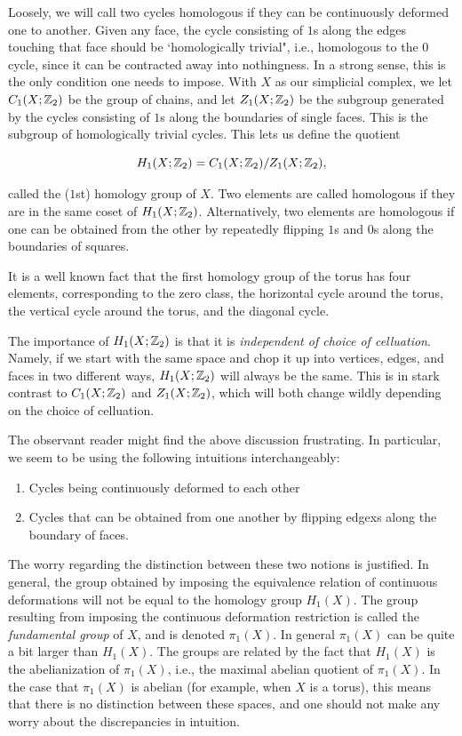 \documentclass{article}
\theoremstyle{definition}
\numberwithin{figure}{section}
\begin{document}
Loosely, we will call two cycles homologous if they can be continuously deformed one to another. Given any face, the cycle consisting of $1$s along the edges touching that face should be `homologically trivial", i.e., homologous to the $0$ cycle, since it can be contracted away into nothingness. In a strong sense, this is the only condition one needs to impose. With $X$ as our simplicial complex, we let $C_1(X;\mathbb{Z}_2)$ be the group of chains, and let $Z_1(X;\mathbb{Z}_2)$ be the subgroup generated by the cycles consisting of $1$s along the boundaries of single faces. This is the subgroup of homologically trivial cycles. This lets us define the quotient

$$H_1(X;\mathbb{Z}_2)=C_1(X;\mathbb{Z}_2)/Z_1(X;\mathbb{Z}_2),$$

called the ($1$st) homology group of $X$. Two elements are called homologous if they are in the same coset of $H_1(X;\mathbb{Z}_2)$. Alternatively, two elements are homologous if one can be obtained from the other by repeatedly flipping $1$s and $0$s along the boundaries of squares.

It is a well known fact that the first homology group of the torus has four elements, corresponding to the zero class, the horizontal cycle around the torus, the vertical cycle around the torus, and the diagonal cycle.

The importance of $H_1(X;\mathbb{Z}_2)$ is that it is \textit{independent of choice of celluation}. Namely, if we start with the same space and chop it up into vertices, edges, and faces in two different ways, $H_1(X;\mathbb{Z}_2)$ will always be the same. This is in stark contrast to $C_1(X;\mathbb{Z}_2)$ and $Z_1(X;\mathbb{Z}_2)$, which will both change wildly depending on the choice of celluation.

The observant reader might find the above discussion frustrating. In particular, we seem to be using the following intuitions interchangeably:

\begin{enumerate}
\item Cycles being continuously deformed to each other
\item Cycles that can be obtained from one another by flipping edgexs along the boundary of faces.
\end{enumerate}

The worry regarding the distinction between these two notions is justified. In general, the group obtained by imposing the equivalence relation of continuous deformations will not be equal to the homology group $H_1(X)$. The group resulting from imposing the continuous deformation restriction is called the \textit{fundamental group} of $X$, and is denoted $\pi_1(X)$. In general $\pi_1(X)$ can be quite a bit larger than $H_1(X)$. The groups are related by the fact that $H_1(X)$ is the abelianization of $\pi_1(X)$, i.e., the maximal abelian quotient of $\pi_1(X)$. In the case that $\pi_1(X)$ is abelian (for example, when $X$ is a torus), this means that there is no distinction between these spaces, and one should not make any worry about the discrepancies in intuition.
\end{document}

